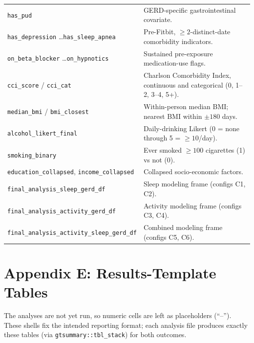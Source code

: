 \documentclass[11pt]{article}
\newcommand{\code}[1]{\texttt{\small #1}}
\begin{document}
\begin{longtable}{@{}p{5.2cm}p{8.3cm}@{}}
\code{has_pud} & GERD-specific gastrointestinal covariate. \\
\code{has_depression} \ldots \code{has_sleep_apnea} & Pre-Fitbit, $\geq 2$-distinct-date comorbidity indicators. \\
\code{on_beta_blocker} \ldots \code{on_hypnotics} & Sustained pre-exposure medication-use flags. \\
\code{cci_score} / \code{cci_cat} & Charlson Comorbidity Index, continuous and categorical (0, 1--2, 3--4, 5+). \\
\code{median_bmi} / \code{bmi_closest} & Within-person median BMI; nearest BMI within $\pm 180$ days. \\
\code{alcohol_likert_final} & Daily-drinking Likert (0 = none through 5 = $\geq 10$/day). \\
\code{smoking_binary} & Ever smoked $\geq 100$ cigarettes (1) vs not (0). \\
\code{education_collapsed}, \code{income_collapsed} & Collapsed socio-economic factors. \\
\code{final_analysis_sleep_gerd_df} & Sleep modeling frame (configs C1, C2). \\
\code{final_analysis_activity_gerd_df} & Activity modeling frame (configs C3, C4). \\
\code{final_analysis_activity_sleep_gerd_df} & Combined modeling frame (configs C5, C6). \\
\bottomrule
\end{longtable}

\section{Appendix E: Results-Template Tables}
The analyses are not yet run, so numeric cells are left as placeholders (``--''). These shells fix the
intended reporting format; each analysis file produces exactly these tables (via
\code{gtsummary::tbl_stack}) for both outcomes.
\end{document}
